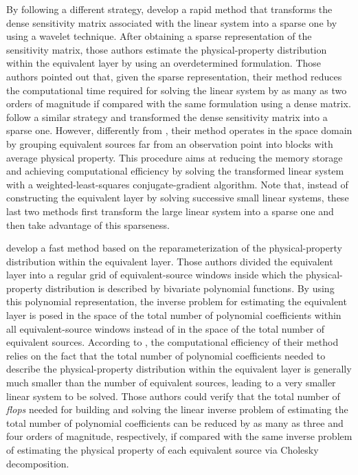 By following a different strategy, \citet{li-oldenburg2010} develop a rapid method that transforms the 
dense sensitivity matrix associated with the linear system into a sparse one by using a wavelet technique. 
After obtaining a sparse representation of the sensitivity matrix, those authors estimate the 
physical-property distribution within the equivalent layer by using an overdetermined formulation. 
Those authors pointed out that, given the sparse representation, their method reduces the computational time 
required for solving the linear system by as many as two orders of magnitude if compared with the same 
formulation using a dense matrix. 
\citet{barnes-lumley2011} follow a similar strategy and transformed the dense sensitivity matrix 
into a sparse one. However, differently from \citet{li-oldenburg2010}, their method operates in the space 
domain by grouping equivalent sources far from an observation point into blocks with average physical 
property. This procedure aims at reducing the memory storage and achieving computational efficiency 
by solving the transformed linear system with a weighted-least-squares conjugate-gradient algorithm.
Note that, instead of constructing the equivalent layer by solving successive small linear systems, 
these last two methods first transform the large linear system into a sparse one and then take advantage of 
this sparseness.

\citet{oliveirajr-etal2013} develop a fast method based on the reparameterization of the physical-property 
distribution within the equivalent layer. Those authors divided the equivalent layer into a regular grid of 
equivalent-source windows inside which the physical-property distribution is described by bivariate 
polynomial functions. By using this polynomial representation, the inverse problem for estimating the 
equivalent layer is posed in the space of the total number of polynomial coefficients within all 
equivalent-source windows instead of in the space of the total number of equivalent sources. According to 
\citet{oliveirajr-etal2013}, the computational efficiency of their method relies on the fact that the total 
number of polynomial coefficients needed to describe the physical-property distribution within the 
equivalent layer is generally much smaller than the number of equivalent sources, leading to a very smaller 
linear system to be solved. Those authors could verify that the total number of \textit{flops} needed for 
building and solving the linear inverse problem of estimating the total number of polynomial coefficients can 
be reduced by as many as three and four orders of magnitude, respectively, if compared with the same inverse 
problem of estimating the physical property of each equivalent source via Cholesky decomposition.

